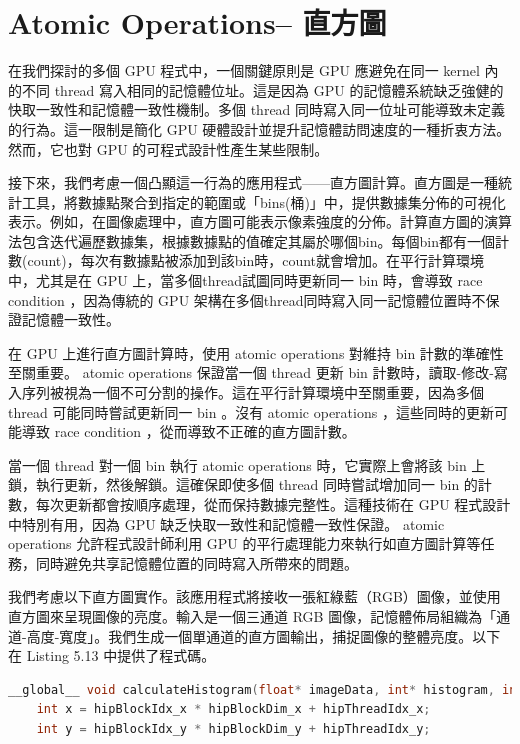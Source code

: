 {\section{ Atomic Operations– 直方圖}
在我們探討的多個 GPU 程式中，一個關鍵原則是 GPU 應避免在同一 kernel 內的不同 thread 寫入相同的記憶體位址。這是因為 GPU 的記憶體系統缺乏強健的快取一致性和記憶體一致性機制。多個 thread 同時寫入同一位址可能導致未定義的行為。這一限制是簡化 GPU 硬體設計並提升記憶體訪問速度的一種折衷方法。然而，它也對 GPU 的可程式設計性產生某些限制。


接下來，我們考慮一個凸顯這一行為的應用程式——直方圖計算。直方圖是一種統計工具，將數據點聚合到指定的範圍或「bins(桶)」中，提供數據集分佈的可視化表示。例如，在圖像處理中，直方圖可能表示像素強度的分佈。計算直方圖的演算法包含迭代遍歷數據集，根據數據點的值確定其屬於哪個bin。每個bin都有一個計數(count)，每次有數據點被添加到該bin時，count就會增加。在平行計算環境中，尤其是在 GPU 上，當多個thread試圖同時更新同一 bin 時，會導致 race condition ，因為傳統的 GPU 架構在多個thread同時寫入同一記憶體位置時不保證記憶體一致性。


在 GPU 上進行直方圖計算時，使用 atomic operations 對維持 bin 計數的準確性至關重要。 atomic operations 保證當一個 thread 更新 bin 計數時，讀取-修改-寫入序列被視為一個不可分割的操作。這在平行計算環境中至關重要，因為多個 thread 可能同時嘗試更新同一 bin 。沒有 atomic operations ，這些同時的更新可能導致 race condition ，從而導致不正確的直方圖計數。


當一個 thread 對一個 bin 執行 atomic operations 時，它實際上會將該 bin 上鎖，執行更新，然後解鎖。這確保即使多個 thread 同時嘗試增加同一 bin 的計數，每次更新都會按順序處理，從而保持數據完整性。這種技術在 GPU 程式設計中特別有用，因為 GPU 缺乏快取一致性和記憶體一致性保證。 atomic operations 允許程式設計師利用 GPU 的平行處理能力來執行如直方圖計算等任務，同時避免共享記憶體位置的同時寫入所帶來的問題。


我們考慮以下直方圖實作。該應用程式將接收一張紅綠藍（RGB）圖像，並使用直方圖來呈現圖像的亮度。輸入是一個三通道 RGB 圖像，記憶體佈局組織為「通道-高度-寬度」。我們生成一個單通道的直方圖輸出，捕捉圖像的整體亮度。以下在 Listing 5.13 中提供了程式碼。
\lstset{style=mystyle}
\begin{lstlisting}[language=c++,caption={使用atomic operations實作的直方圖 GPU kernel}]
__global__ void calculateHistogram(float* imageData, int* histogram, int width, int height, int channels, int numBins) {
    int x = hipBlockIdx_x * hipBlockDim_x + hipThreadIdx_x;
    int y = hipBlockIdx_y * hipBlockDim_y + hipThreadIdx_y;


\end{lstlisting}}
